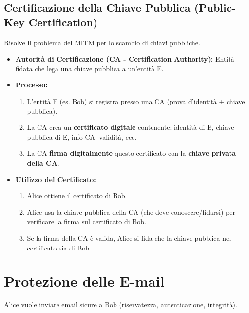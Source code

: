\documentclass{article}
\begin{document}
\subsection{Certificazione della Chiave Pubblica (Public-Key Certification)}
Risolve il problema del MITM per lo scambio di chiavi pubbliche.
\begin{itemize}
    \item \textbf{Autorità di Certificazione (CA - Certification Authority):} Entità fidata che lega una chiave pubblica a un'entità E.
    \item \textbf{Processo:}
    \begin{enumerate}
        \item L'entità E (es. Bob) si registra presso una CA (prova d'identità + chiave pubblica).
        \item La CA crea un \textbf{certificato digitale} contenente: identità di E, chiave pubblica di E, info CA, validità, ecc.
        \item La CA \textbf{firma digitalmente} questo certificato con la \textbf{chiave privata della CA}.
    \end{enumerate}
    \item \textbf{Utilizzo del Certificato:}
    \begin{enumerate}
        \item Alice ottiene il certificato di Bob.
        \item Alice usa la chiave pubblica della CA (che deve conoscere/fidarsi) per verificare la firma sul certificato di Bob.
        \item Se la firma della CA è valida, Alice si fida che la chiave pubblica nel certificato sia di Bob.
    \end{enumerate}
\end{itemize}

\section{Protezione delle E-mail}
\label{sec:protezione_email}

Alice vuole inviare email sicure a Bob (riservatezza, autenticazione, integrità).
\end{document}
